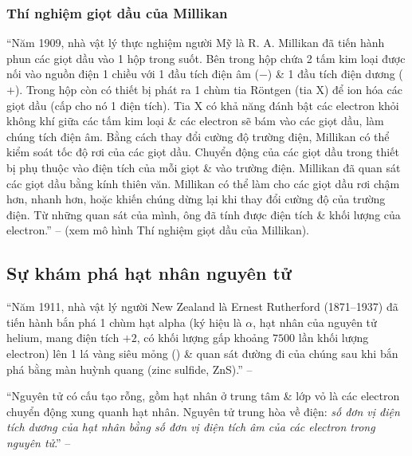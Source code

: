 \documentclass[oneside]{book}
\numberwithin{equation}{section}
\begin{document}
\subsubsection{Thí nghiệm giọt dầu của Millikan}
``Năm 1909, nhà vật lý thực nghiệm người Mỹ là R. A. Millikan đã tiến hành phun các giọt dầu vào 1 hộp trong suốt. Bên trong hộp chứa 2 tấm kim loại được nối vào nguồn điện 1 chiều với 1 đầu tích điện âm ($-$) \& 1 đầu tích điện dương ($+$). Trong hộp còn có thiết bị phát ra 1 chùm tia R\"ontgen (tia X) để ion hóa các giọt dầu (cấp cho nó 1 điện tích). Tia X có khả năng đánh bật các electron khỏi không khí giữa các tấm kim loại \& các electron sẽ bám vào các giọt dầu, làm chúng tích điện âm. Bằng cách thay đổi cường độ trường điện, Millikan có thể kiểm soát tốc độ rơi của các giọt dầu. Chuyển động của các giọt dầu trong thiết bị phụ thuộc vào điện tích của mỗi giọt \& vào trường điện. Millikan đã quan sát các giọt dầu bằng kính thiên văn. Millikan có thể làm cho các giọt dầu rơi chậm hơn, nhanh hơn, hoặc khiến chúng dừng lại khi thay đổi cường độ của trường điện. Từ những quan sát của mình, ông đã tính được điện tích \& khối lượng của electron.'' -- \cite[p. 15]{SGK_Hoa_Hoc_10_Chan_Troi_Sang_Tao} (xem mô hình \textsf{Thí nghiệm giọt dầu của Millikan}).

\subsection{Sự khám phá hạt nhân nguyên tử}
``Năm 1911, nhà vật lý người New Zealand là Ernest Rutherford (1871--1937) đã tiến hành bắn phá 1 chùm hạt alpha (ký hiệu là $\alpha$, hạt nhân của nguyên tử helium, mang điện tích $+2$, có khối lượng gấp khoảng $7500$ lần khối lượng electron) lên 1 lá vàng siêu mỏng (\cite[Hình 2.3: \textsf{Thí nghiệm khám phá hạt nhân nguyên tử của Rutherford}, p. 16]{SGK_Hoa_Hoc_10_Chan_Troi_Sang_Tao}) \& quan sát đường đi của chúng sau khi bắn phá bằng màn huỳnh quang (zinc sulfide, ZnS).'' -- \cite[p. 15]{SGK_Hoa_Hoc_10_Chan_Troi_Sang_Tao}

``Nguyên tử có cấu tạo rỗng, gồm hạt nhân ở trung tâm \& lớp vỏ là các electron chuyển động xung quanh hạt nhân. Nguyên tử trung hòa về điện: \textit{số đơn vị điện tích dương của hạt nhân bằng số đơn vị điện tích âm của các electron trong nguyên tử}.'' -- \cite[p. 16]{SGK_Hoa_Hoc_10_Chan_Troi_Sang_Tao}
\end{document}
